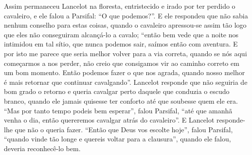 Assim permaneceu Lancelot na floresta, entristecido e irado por ter perdido o
cavaleiro, e ele falou a Parsifal: “O que podemos?”. E ele respondeu que não
sabia nenhum conselho para estas coisas, quando o cavaleiro apressou-se assim
tão logo que eles não conseguiram alcançá-lo a cavalo; “então bem vede que a
noite nos intimidou em tal sítio, que nunca podemos sair, saímos então com
aventura. E por isto me parece que seria melhor volver para a via correta,
quando se nós aqui começarmos a nos perder, não creio que consigamos vir ao
caminho correto em um bom momento. Então podemos fazer o que nos agrada, quando
nosso melhor é mais retornar que continuar cavalgando”. Lancelot responde que
não seguiria de bom grado o retorno e queria cavalgar perto daquele que
conduzia o escudo branco, quando ele jamais quisesse ter conforto até que
soubesse quem ele era. “Mas por tanto tempo podeis bem esperar”, falou
Parsifal, “até que amanhã venha o dia, então quereremos cavalgar atrás do
cavaleiro”. E Lancelot responde-lhe que não o queria fazer. “Então que Deus
vos escolte hoje”, falou Parsifal, “quando vinde tão longe e quereis voltar
para a clausura”, quando ele falou, deveria reconhecê-lo bem. 

